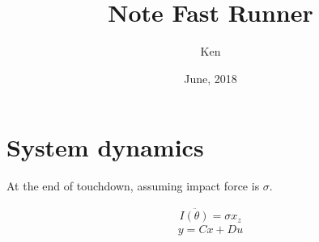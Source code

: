 \documentclass{article}
\title{Note Fast Runner}
\author{Ken}
\date{June, 2018}
\begin{document}
\maketitle
\section{System dynamics}

At the end of touchdown, assuming impact force is $\sigma$.

\begin{align}
\label{eqn:SLIP1}
I \ddot{(\theta)} = \sigma  x_z
\end{align}
\[
y={C}x+{D}u\]
\end{document}
